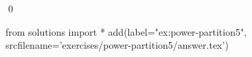 
\begin{ex} 
  \label{ex:power-partition5}
  
  \qed
\end{ex} 
\begin{python0}
from solutions import *
add(label="ex:power-partition5",
    srcfilename='exercises/power-partition5/answer.tex') 
\end{python0}
